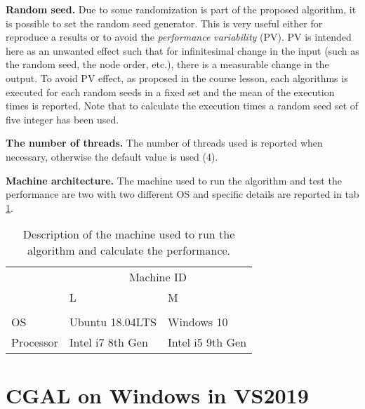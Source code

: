 \documentclass[10pt, english, openany]{report}
\begin{document}
\begin{appendices}
			\textbf{Random seed.} Due to some randomization is part of the proposed algorithm, it is possible to set the random seed generator. This is very useful either for reproduce a results or to avoid the \textit{performance variability} (PV). PV is intended here as an unwanted effect such that for infinitesimal change in the input (such as the random seed, the node order, etc.), there is a measurable change in the output. To avoid PV effect, as proposed in the course lesson, each algorithms is executed for each random seeds in a fixed set and the mean of the execution times is reported. Note that to calculate the execution times a random seed set of five integer has been used.
			
			\textbf{The number of threads.} The number of threads used is reported when necessary, otherwise the default value is used (4).
			
			\textbf{Machine architecture.} The machine used to run the algorithm and test the performance are two with two different OS and specific details are reported in tab \ref{tab:machines}.
			\begin{table}[h]
				\begin{center}
					\caption{Description of the machine used to run the algorithm and calculate the performance.}
					\label{tab:machines}
					\begin{tabular}{lll}
									&   \multicolumn{2}{c}{Machine ID} 	\\
						 			& L 				&	 M 			\\ \hline \\
						OS 			& Ubuntu 18.04LTS 	& Windows 10 	\\
						Processor	& Intel i7 8th Gen	&	Intel i5 9th Gen		\\
					\end{tabular}
				\end{center}
			\end{table}

		\chapter{CGAL on Windows in VS2019} \label{sec:testset}

\end{appendices}
\end{document}
